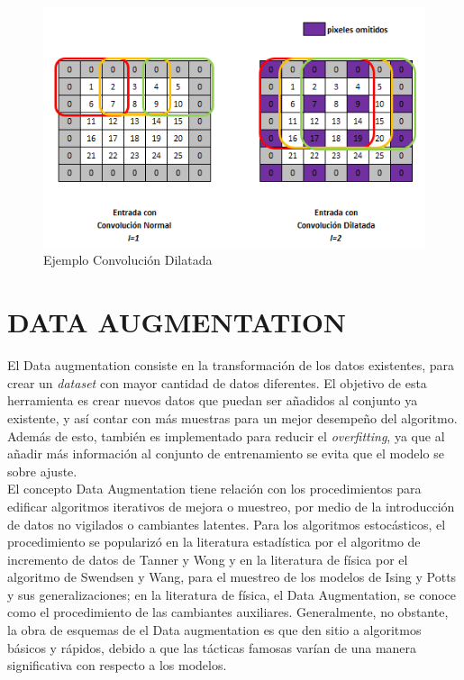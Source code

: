 \begin{figure}[ht]
	\centering
	\includegraphics[scale=0.6]{Figs/Convolucion_dilatada.png}
	\caption{Ejemplo Convolución Dilatada}
	\label{fig:cd}
\end{figure}


\section{DATA AUGMENTATION}
El Data augmentation consiste en la transformación de los datos existentes, para crear un \textit{dataset} con mayor cantidad de datos diferentes. El objetivo de esta herramienta es crear nuevos datos que puedan ser añadidos al conjunto ya existente, y así contar con más muestras para un mejor desempeño del algoritmo. Además de esto, también es implementado para reducir el \textit{overfitting}, ya que al añadir más información al conjunto de entrenamiento se evita que el modelo se sobre ajuste. \\


El concepto Data Augmentation tiene relación con los procedimientos para edificar algoritmos iterativos de mejora o muestreo, por medio de la introducción de datos no vigilados o cambiantes latentes. Para los algoritmos estocásticos, el procedimiento se popularizó en la literatura estadística por el algoritmo de incremento de datos de Tanner y Wong y en la literatura de física por el algoritmo de Swendsen y Wang, para el muestreo de los modelos de Ising y Potts y sus generalizaciones; en la literatura de física, el Data Augmentation, se conoce como el procedimiento de las cambiantes auxiliares. Generalmente, no obstante, la obra de esquemas de el Data augmentation es que den sitio a algoritmos básicos y rápidos, debido a que las tácticas famosas varían de una manera significativa con respecto a los modelos.\cite{van2001art}

